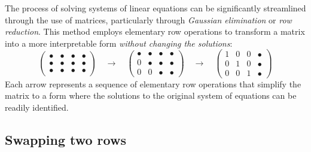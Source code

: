 \documentclass{ximera}
\begin{document}
The process of solving systems of linear equations can be
significantly streamlined through the use of matrices, particularly
through \textit{Gaussian elimination} or \textit{row reduction}. This
method employs elementary row operations to transform a matrix into a
more interpretable form \emph{without changing the solutions}:
\[
  \begin{pmatrix}
    \bullet & \bullet & \bullet & \bullet \\
    \bullet & \bullet & \bullet & \bullet \\
    \bullet & \bullet & \bullet & \bullet
  \end{pmatrix}
  \quad \longrightarrow \quad
  \begin{pmatrix}
    \bullet & \bullet & \bullet & \bullet \\
    0 & \bullet & \bullet & \bullet \\
    0 & 0 & \bullet & \bullet
  \end{pmatrix}
  \quad \longrightarrow \quad
  \begin{pmatrix}
    1 & 0 & 0 & \bullet \\
    0 & 1 & 0 & \bullet \\
    0 & 0 & 1 & \bullet
  \end{pmatrix}
\]
Each arrow represents a sequence of elementary row operations that
simplify the matrix to a form where the solutions to the original
system of equations can be readily identified.


\subsection{Swapping two rows}
\end{document}
